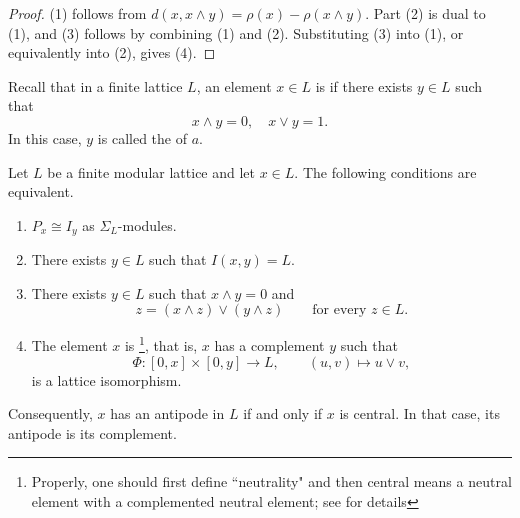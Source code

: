 \documentclass[a4paper,leqno]{amsart}
\begin{document}
\begin{proof}
(1) follows from $d(x,x\wedge y)=\rho(x)-\rho(x\wedge y)$. Part (2) is dual to (1), and (3) follows by combining (1) and (2). Substituting (3) into (1), or equivalently into (2), gives (4).
\end{proof}

Recall that in a finite lattice $L$, an element $x\in L$ is  if there exists $y\in L$ such that \[ x\wedge y =0, \quad x\vee y=1.\]
In this case, $y$ is called the  of $a$.

\begin{lem}\label{lem:modular-lattice-central-antipode}
Let $L$ be a finite modular lattice and let $x\in L$. The following
conditions are equivalent.
\begin{enumerate}
\item $P_x \cong I_y$ as $\Sigma_L$-modules.
    \item There exists $y\in L$ such that $I(x,y)=L$.
    \item There exists $y\in L$ such that $x\wedge y=0$ and
    \[
    z=(x\wedge z)\vee(y\wedge z)
    \qquad\text{for every }z\in L.
    \]
    \item The element $x$ is \footnote{Properly, one should first define ``neutrality" and then central means a neutral element with a complemented neutral element; see \cite[III.1]{Gra03} for details}, that is, $x$ has a complement $y$ such that
    \[
    \Phi:[0,x]\times[0,y]\longrightarrow L,
    \qquad (u,v)\longmapsto u\vee v,
    \]
    is a lattice isomorphism.
\end{enumerate}
Consequently, $x$ has an antipode in $L$ if and only if $x$ is central. 
In that case, its antipode is its complement.
\end{lem}
\end{document}
